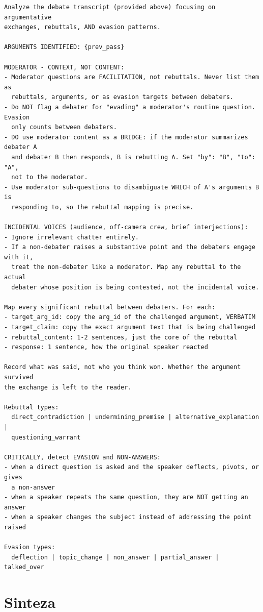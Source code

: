 \documentclass[a4paper, 12pt]{book}
\begin{document}
\begin{lstlisting}[basicstyle=\ttfamily\scriptsize,breaklines=true]
Analyze the debate transcript (provided above) focusing on argumentative
exchanges, rebuttals, AND evasion patterns.

ARGUMENTS IDENTIFIED: {prev_pass}

MODERATOR - CONTEXT, NOT CONTENT:
- Moderator questions are FACILITATION, not rebuttals. Never list them as
  rebuttals, arguments, or as evasion targets between debaters.
- Do NOT flag a debater for "evading" a moderator's routine question. Evasion
  only counts between debaters.
- DO use moderator content as a BRIDGE: if the moderator summarizes debater A
  and debater B then responds, B is rebutting A. Set "by": "B", "to": "A",
  not to the moderator.
- Use moderator sub-questions to disambiguate WHICH of A's arguments B is
  responding to, so the rebuttal mapping is precise.

INCIDENTAL VOICES (audience, off-camera crew, brief interjections):
- Ignore irrelevant chatter entirely.
- If a non-debater raises a substantive point and the debaters engage with it,
  treat the non-debater like a moderator. Map any rebuttal to the actual
  debater whose position is being contested, not the incidental voice.

Map every significant rebuttal between debaters. For each:
- target_arg_id: copy the arg_id of the challenged argument, VERBATIM
- target_claim: copy the exact argument text that is being challenged
- rebuttal_content: 1-2 sentences, just the core of the rebuttal
- response: 1 sentence, how the original speaker reacted

Record what was said, not who you think won. Whether the argument survived
the exchange is left to the reader.

Rebuttal types:
  direct_contradiction | undermining_premise | alternative_explanation |
  questioning_warrant

CRITICALLY, detect EVASION and NON-ANSWERS:
- when a direct question is asked and the speaker deflects, pivots, or gives
  a non-answer
- when a speaker repeats the same question, they are NOT getting an answer
- when a speaker changes the subject instead of addressing the point raised

Evasion types:
  deflection | topic_change | non_answer | partial_answer | talked_over
\end{lstlisting}


\section{Sinteza}
\label{app:poziv-sinteza}
\end{document}
